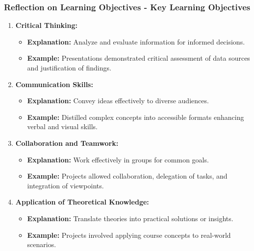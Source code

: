 \documentclass[aspectratio=169]{beamer}
\begin{document}
\begin{frame}[fragile]
    \frametitle{Reflection on Learning Objectives - Key Learning Objectives}
    \begin{enumerate}
        \item \textbf{Critical Thinking:}
            \begin{itemize}
                \item \textbf{Explanation:} Analyze and evaluate information for informed decisions.
                \item \textbf{Example:} Presentations demonstrated critical assessment of data sources and justification of findings.
            \end{itemize}
            
        \item \textbf{Communication Skills:}
            \begin{itemize}
                \item \textbf{Explanation:} Convey ideas effectively to diverse audiences.
                \item \textbf{Example:} Distilled complex concepts into accessible formats enhancing verbal and visual skills.
            \end{itemize}

        \item \textbf{Collaboration and Teamwork:}
            \begin{itemize}
                \item \textbf{Explanation:} Work effectively in groups for common goals.
                \item \textbf{Example:} Projects allowed collaboration, delegation of tasks, and integration of viewpoints.
            \end{itemize}

        \item \textbf{Application of Theoretical Knowledge:}
            \begin{itemize}
                \item \textbf{Explanation:} Translate theories into practical solutions or insights.
                \item \textbf{Example:} Projects involved applying course concepts to real-world scenarios.
            \end{itemize}
    \end{enumerate}
\end{frame}
\end{document}
